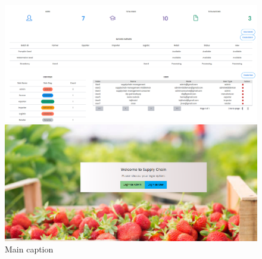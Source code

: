 \begin{figure}[ht]
    \centering
    \begin{minipage}[b]{\linewidth}
      \centering
      \includegraphics[width=\linewidth]{Chapters/Chapter_5/figures/dashboard.png}
    \end{minipage}
    \hfill
    \begin{minipage}[b]{\linewidth}
      \centering
      \includegraphics[width=\linewidth]{Chapters/Chapter_5/figures/login.png}
    \end{minipage}
    \caption{Main caption}
    \label{fig:figure5_4}
    \end{figure}
